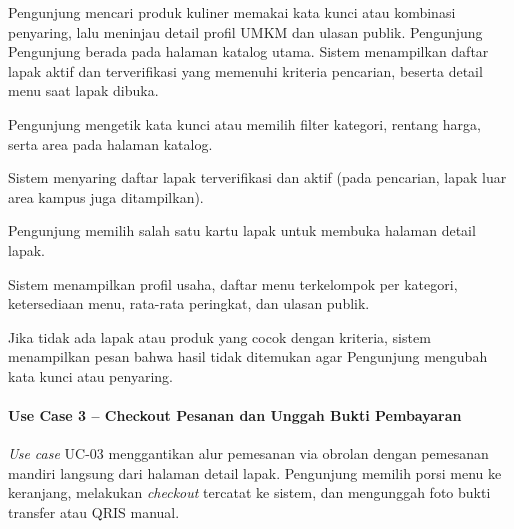 {Pengunjung mencari produk kuliner memakai kata kunci atau kombinasi penyaring, lalu meninjau detail profil UMKM dan ulasan publik.}
{Pengunjung}
{Pengunjung berada pada halaman katalog utama.}
{Sistem menampilkan daftar lapak aktif dan terverifikasi yang memenuhi kriteria pencarian, beserta detail menu saat lapak dibuka.}
{\begin{uclist}
  \item Pengunjung mengetik kata kunci atau memilih filter kategori, rentang harga, serta area pada halaman katalog.
  \item Sistem menyaring daftar lapak terverifikasi dan aktif (pada pencarian, lapak luar area kampus juga ditampilkan).
  \item Pengunjung memilih salah satu kartu lapak untuk membuka halaman detail lapak.
  \item Sistem menampilkan profil usaha, daftar menu terkelompok per kategori, ketersediaan menu, rata-rata peringkat, dan ulasan publik.
\end{uclist}}
{\begin{ucbullet}
  \item Jika tidak ada lapak atau produk yang cocok dengan kriteria, sistem menampilkan pesan bahwa hasil tidak ditemukan agar Pengunjung mengubah kata kunci atau penyaring.
\end{ucbullet}}

\paragraph{Use Case 3 -- Checkout Pesanan dan Unggah Bukti Pembayaran}
\textit{Use case} UC-03 menggantikan alur pemesanan via obrolan dengan pemesanan mandiri langsung dari halaman detail lapak. Pengunjung memilih porsi menu ke keranjang, melakukan \textit{checkout} tercatat ke sistem, dan mengunggah foto bukti transfer atau QRIS manual.


